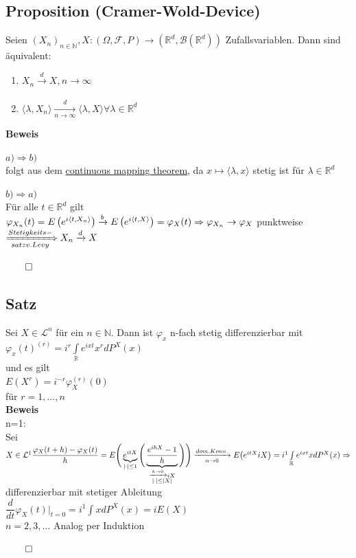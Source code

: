 \documentclass[german,10pt,oneside, fleqn, a4paper]{article}
\newcommand {\R}	{\mathbb{R}}
\newcommand {\N}	{\mathbb{N}}
\newcommand{\Ra}	{\Rightarrow}
\newcommand{\ra}{\rightarrow}
\newcommand{\brc}[1]{\left(#1\right)}
\newcommand{\folge}[3][\N]{\left(#2_#3\right)_{#3\in #1}}
\newcommand{\QED}{\begin{flushright}$\qed$\end{flushright}}
\newcommand{\mc}[1]{\mathcal{#1}}
\newcommand{\lp}[1]{\mc{L}^{#1}}
\newcommand{\beweis}{\textbf{Beweis}\\}
\newcommand{\toinf}{\rightarrow\infty}
\newcommand{\1}[1]{1_{#1}}
\newcommand{\2}[1]{\1{\brac{#1}}}
\newcommand{\xr}[2][]{\xrightarrow[#1]{#2}}
\newcommand{\rbor}[1][d]{\brc{\R^{#1},\mc{B}\brc{\R^{#1}}}}
\newcommand{\raum}{\brc{\Omega,\mc{F},P}}
\newcommand{\intr}{\int\limits_\R}
\begin{document}
\subsection{Proposition (Cramer-Wold-Device)}
\label{4.13}
Seien $\folge{X}{n}, X:\raum\ra\rbor$ Zufallsvariablen. Dann sind äquivalent:\begin{enumerate}[label=(\alph*)]
\item $X_n\xr{d}X, n\toinf$
\item $\langle \lambda,X_n\rangle\xr[n\toinf]{d}\langle\lambda,X\rangle\forall\lambda\in\R^d$
\end{enumerate}
\beweis
\begin{list}{•}{}
\item $a)\Ra b)$\\
folgt aus dem \hyperref[2.6]{continuous mapping theorem}, da $x\mapsto\langle \lambda,x\rangle$ stetig ist für $\lambda\in\R^d$
\item $b)\Ra a)$\\
Für alle $t\in\R^d$ gilt\\
$\varphi_{X_n}(t)=E\brc{e^{i\langle t,X_n\rangle}}\xr{b}E\brc{e^{i\langle t,X\rangle}}=\varphi_X(t)\\
\Ra \varphi_{X_n}\ra\varphi_X$ punktweise $\xRightarrow[satz v. Levy]{Stetigkeits-} X_n\xr{d}X$\QED
\end{list}
\subsection{Satz}
\label{4.14}
Sei $X\in\lp{n}$ für ein $n\in\N$. Dann ist $\varphi_x$ n-fach stetig differenzierbar mit \\
$\varphi_x(t)^{(r)}=i^r\intr e^{ixt}x^rdP^X(x)$\\
und es gilt\\
$E(X^r)=i^{-r}\varphi_X^{(r)}(0)$\\
für $r=1,...,n$\\
\beweis
n=1: \\
Sei $X\in\lp{1}\\
\dfrac{\varphi_X(t+h)-\varphi_X(t)}{h}=E\Bigg(\underbrace{e^{itX}}_{|\cdot|\leq 1}\Bigg(\underbrace{\dfrac{e^{ihX}-1}{h}}_{\substack{\xr{h\ra0}iX\\|\cdot|\leq|X|}}\Bigg)\Bigg)\\
\xr[n\ra0]{dom.Konv.}E\big(e^{itX}iX\big)=i^1\intr e^{ixt}xdP^X(x)\\
\Ra$ differenzierbar mit stetiger Ableitung\\
$\dfrac{d}{dt}\varphi_X(t)\Bigg|_{t=0}=i^1\int xdP^X(x)=iE(X)$\\
$n=2,3,...$ Analog per Induktion\QED
\end{document}

